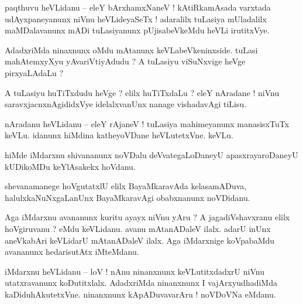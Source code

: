 \documentclass{article}
\begin{document}

\begin{mn}%
paqthuvu heVLidanu -- eleY bArxhamxNaneV ! kAtiRkamAsada varxtada udAyxpaneyanunx niVnu 
heVLideyaSeTx ! adaralilx tuLasiya mUladalilx maMDalavanunx mADi tuLasiyanunx pUjisabeVkeMdu heVLi 
irutitxVye.
\end{mn}

\begin{mn}%
AdadxriMda ninaxnunx oMdu mAtanunx keVLabeVkeninxside. tuLasi mahAtemxyXyu yAvariVtiyAdudu ? A 
tuLasiyu viSuNxvige heVge pirxyaLAdaLu ?
\end{mn}

\begin{mn}%
A tuLasiyu huTiTxdudu heVge ? elilx huTiTxdaLu ? eleY nAradane ! niVnu saravxjacnxnAgididxVye 
idelalxvanUnx nanage vishadavAgi tiLisu.
\end{mn}

\begin{mn}%
nAradanu heVLidanu -- eleY rAjaneV ! tuLasiya mahimeyanunx manasisxTuTx keVLu. idanunx hiMdina 
katheyoVDane heVLutetxVne. keVLu.
\end{mn}

\begin{mn}%
hiMde iMdarxnu shivananunx noVDalu deVvategaLoDaneyU apasxrayaroDaneyU kUDikoMDu keYlAsakekx hoVdanu.
\end{mn}

\begin{mn}%
shevanamanege hoVgutatxlU elilx BayaMkaravAda kelasamADuva, halulxkaNuNxgaLanUnx BayaMkaravAgi 
obabxnanunx noVDidanu.
\end{mn}

\begin{mn}%
Aga iMdarxnu avananunx kuritu ayayx niVnu yAru ? A jagadiVshavxranu elilx hoVgiruvanu ? eMdu 
keVLidanu. avanu mAtanADaleV ilalx. adarU inUnx aneVkabAri keVLidarU mAtanADaleV ilalx. Aga 
iMdarxnige koVpabaMdu avananunx hedarisutAtx iMteMdanu.
\end{mn}

\begin{mn}%
iMdarxnu heVLidanu -- loV ! nAnu ninanxnunx keVLutitxdadxrU niVnu utatxravanunx koDutitxlalx. 
AdadxriMda ninanxnunx I vajArxyudhadiMda kaDiduhAkutetxVne. ninanxnunx kApADuvavarAru ! noVDoVNa 
eMdanu.
\end{mn}
\end{document}

